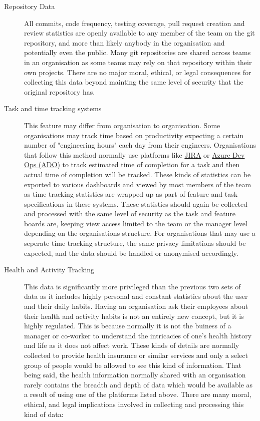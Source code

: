 \documentclass[11pt, a4paper]{article}
\begin{document}
    \begin{description}
        \item[Repository Data] All commits, code frequency, testing coverage, pull request creation and review statistics are openly available to any member of the team on the git repository, and more than likely anybody in the organisation and potentially even the public. Many git repositories are shared across teams in an organisation as some teams may rely on that repository within their own projects. There are no major moral, ethical, or legal consequences for collecting this data beyond mainting the same level of security that the original repository has. 
        \item[Task and time tracking systems] This feature may differ from organisation to organisation. Some organisations may track time based on productivity expecting a certain number of "engineering hours" each day from their engineers. Organisations that follow this method normally use platforms like \href{https://www.atlassian.com/software/jira}{JIRA} or \href{https://azure.microsoft.com/en-us/services/devops/}{Azure Dev Ops (ADO)} to track estimated time of completion for a task and then actual time of completion will be tracked. These kinds of statistics can be exported to various dashboards and viewed by most members of the team as time tracking statistics are wrapped up as part of feature and task specifications in these systems. These statistics should again be collected and processed with the same level of security as the task and feature boards are, keeping view access limited to the team or the manager level depending on the organisations structure. For organisations that may use a seperate time tracking structure, the same privacy limitations should be expected, and the data should be handled or anonymised accordingly.
        \item[Health and Activity Tracking] This data is significantly more privileged than the previous two sets of data as it includes highly personal and constant statistics about the user and their daily habits. Having an organisation ask their employees about their health and activity habits is not an entirely new concept, but it is highly regulated. This is because normally it is not the buiness of a manager or co-worker to understand the intricacies of one's health history and life as it does not affect work. These kinds of details are normally collected to provide health insurance or similar services and only a select group of people would be allowed to see this kind of information. That being said, the health information normally shared with an organisation rarely contains the breadth and depth of data which would be available as a result of using one of the platforms listed above.  There are many moral, ethical, and legal implications involved in collecting and processing this kind of data:

\end{description}
\end{document}
